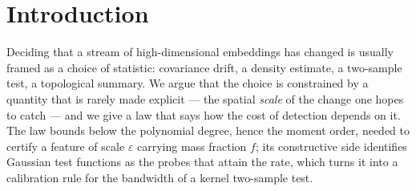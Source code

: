 \documentclass[11pt]{article}
\theoremstyle{remark}
\begin{document}
\section{Introduction}
Deciding that a stream of high-dimensional embeddings has changed is usually framed as a choice of
statistic: covariance drift, a density estimate, a two-sample test, a topological summary. We argue
that the choice is constrained by a quantity that is rarely made explicit --- the spatial
\emph{scale} of the change one hopes to catch --- and we give a law that says how the cost of
detection depends on it. The law bounds below the polynomial degree, hence the moment order, needed
to certify a feature of scale $\varepsilon$ carrying mass fraction $f$; its constructive side
identifies Gaussian test functions as the probes that attain the rate, which turns it into a
calibration rule for the bandwidth of a kernel two-sample test.
\end{document}
